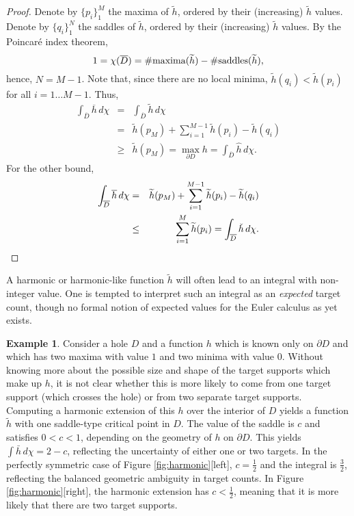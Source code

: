 \documentclass{psapm-l}
\theoremstyle{definition}
\newtheorem{example}[theorem]{Example}
\theoremstyle{remark}
\numberwithin{equation}{section}
\begin{document}
\begin{proof}
Denote by $\{p_i\}_1^M$ the maxima of $\widetilde{h}$, ordered by their (increasing) $\widetilde{h}$ values. Denote by $\{q_i\}_1^N$ the saddles of $\widetilde{h}$, ordered by their (increasing) $\widetilde{h}$ values. By the Poincar\'e index theorem,
\[
    1 = \chi(\overline{D}) =
    \#{\mbox{\rm maxima}}(\widetilde{h})
    -
    \#{\mbox{\rm saddles}}(\widetilde{h}) ,
\]
hence, $N=M-1$. Note that, since there are no local minima, $\widetilde{h}(q_i)<\widetilde{h}(p_i)$ for all $i=1\ldots M-1$. Thus,
\begin{eqnarray*}
    \int_{\overline{D}}\overline{h}\,d\chi
    &=&
    \int_{\overline{D}}\widetilde{h}\,d\chi
    \\
    &=&
    \widetilde{h}(p_M) + \sum_{i=1}^{M-1} \widetilde{h}(p_i)-\widetilde{h}(q_i)
    \\
    &\geq&
    \widetilde{h}(p_M)
=    \max_{\partial D}h
=    \int_{\overline{D}}\hat{h}\,d\chi .
\end{eqnarray*}
For the other bound,
\begin{eqnarray*}
    \int_{\overline{D}}\overline{h}\,d\chi
    &=&
    \widetilde{h}(p_M) + \sum_{i=1}^{M-1} \widetilde{h}(p_i)-\widetilde{h}(q_i)
    \\
    &\leq&
    \sum_{i=1}^{M} \widetilde{h}(p_i)
=    \int_{\overline{D}}{\rlap{\smash{\raisebox{2.25ex}{{\raisebox{1ex}{\rotatebox{180}{{$\hat{~}\,$}}}}}}}{h}}\,d\chi .
\end{eqnarray*}
\end{proof}

A harmonic or harmonic-like function $\widetilde{h}$ will often lead to an integral with non-integer value. One is tempted to interpret such an integral as an {\em expected} target count, though no formal notion of expected values for the Euler calculus as yet exists.

\begin{example}
\label{ex:grid}
Consider a hole $D$ and a function $h$ which is known only on $\partial D$ and which has two maxima with value $1$ and two minima with value $0$. Without knowing more about the possible size and shape of the target supports which make up $h$, it is not clear whether this is more likely to come from one target support (which crosses the hole) or from two separate target supports. Computing a harmonic extension of this $h$ over the interior of $D$ yields a function $\widetilde{h}$ with one saddle-type critical point in $D$. The value of the saddle is $c$ and satisfies $0<c<1$, depending on the geometry of $h$ on $\partial D$. This yields $\int\bar{h}\,d\chi=2-c$, reflecting the uncertainty of either one or two targets. In the perfectly symmetric case of Figure \ref{fig:harmonic}[left], $c=\frac{1}{2}$ and the integral is $\frac{3}{2}$, reflecting the balanced geometric ambiguity in target counts. In Figure \ref{fig:harmonic}[right], the harmonic extension has $c<\frac{1}{2}$, meaning that it is more likely that there are two target supports.
\end{example}
\end{document}
